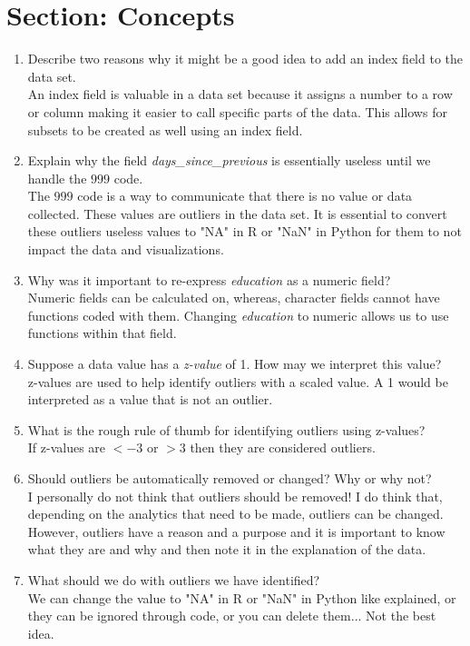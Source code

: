 \documentclass[11pt]{article}
\theoremstyle{definition}
\newcommand{\1}[1]{\mathbf{1} \left \{ #1 \right \}}
\begin{document}
\section{Section: Concepts}
\begin{enumerate}\addtocounter{enumi}{32}
    \item Describe two reasons why it might be a good idea to add an index field to the data set. \\
    An index field is valuable in a data set because it assigns a number to a row or column making it easier to call specific parts of the data.  This allows for subsets to be created as well using an index field.
    \item Explain why the field \textit{days\_since\_previous} is essentially useless until we handle the $999$ code. \\
    The $999$ code is a way to communicate that there is no value or data collected.  These values are outliers in the data set.  It is essential to convert these outliers useless values to "NA" in R or "NaN" in Python for them to not impact the data and visualizations.
    \item Why was it important to re-express \textit{education} as a numeric field? \\
    Numeric fields can be calculated on, whereas, character fields cannot have functions coded with them.  Changing \textit{education} to numeric allows us to use functions within that field.
    \item Suppose a data value has a \textit{z-value} of 1.  How may we interpret this value? \\
    z-values are used to help identify outliers with a scaled value.  A 1 would be interpreted as a value that is not an outlier.
    \item What is the rough rule of thumb for identifying outliers using z-values? \\
    If z-values are $< -3$ or $> 3$ then they are considered outliers.
    \item Should outliers be automatically removed or changed?  Why or why not? \\
    I personally do not think that outliers should be removed!  I do think that, depending on the analytics that need to be made, outliers can be changed.  However, outliers have a reason and a purpose and it is important to know what they are and why and then note it in the explanation of the data.
    \item What should we do with outliers we have identified? \\
    We can change the value to "NA" in R or "NaN" in Python like explained, or they can be ignored through code, or you can delete them... Not the best idea.
\end{enumerate}
\end{document}
